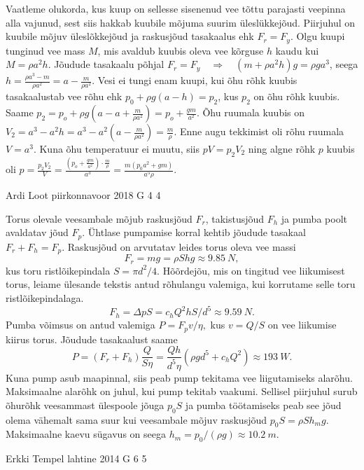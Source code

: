 \documentclass[11pt, twoside]{article}
\begin{document}
{{\ifSolution
Vaatleme olukorda, kus kuup on sellesse sisenenud vee tõttu parajasti veepinna alla vajunud, sest siis hakkab kuubile  mõjuma suurim üleslükkejõud. Piirjuhul on kuubile mõjuv üleslõkkejõud ja raskusjõud tasakaalus ehk $F_r = F_y$. Olgu kuupi tunginud vee mass $M$, mis avaldub kuubis oleva vee kõrguse $h$ kaudu kui $M = \rho a^2h$. Jõudude tasakaalu põhjal $F_r = F_y \quad\Rightarrow\quad (m + \rho a^2h)g=\rho ga^3$, seega $h = \frac{\rho a^3 - m}{\rho a^2} = a - \frac{m}{\rho a^2}$. Vesi ei tungi enam kuupi, kui õhu rõhk kuubis tasakaalustab vee rõhu ehk $p_0 + \rho g(a-h) = p_2$, kus $p_2$ on õhu rõhk kuubis. Saame $p_2 = p_o + \rho g\left(a - a + \frac{m}{\rho a^2}\right) = p_o +  \frac{gm}{a^2}$. Õhu ruumala kuubis on $V_2 = a^3 - a^2h = a^3 - a^2\left(a - \frac{m}{\rho a^2}\right) = \frac{m}{\rho}$. Enne augu tekkimist oli rõhu ruumala $V=a^3$. Kuna õhu temperatuur ei muutu, siis $pV = p_2V_2$ ning algne rõhk $p$ kuubis oli
$p = \frac{p_2V_2}{V} = \frac{ \left( p_o +  \frac{gm}{a^2} \right) \cdot \frac{m}{\rho}}{a^3} = \frac{m(p_0a^2 + gm)}{a^5\rho}$.
\fi
}

{Ardi Loot} %
{piirkonnavoor} %
{2018} %
{G 4} %
{4} %
{

\ifSolution
\osa Torus olevale veesambale mõjub raskusjõud $F_{r}$, takistusjõud $F_{h}$
ja pumba poolt avaldatav jõud $F_{p}$. Ühtlase pumpamise korral
kehtib jõudude tasakaal $F_{r}+F_{h}=F_{p}$. Raskusjõud on
arvutatav leides torus oleva vee massi
\[
F_{r}=mg=\rho Shg\approx\SI{9.85}{N},
\]
kus toru ristlõikepindala $S=\pi d^{2}/4.$ Hõõrdejõu, mis
on tingitud vee liikumisest torus, leiame ülesande tekstis antud rõhulangu
valemiga, kui korrutame selle toru ristlõikepindalaga.
\[
F_{h}=\Delta pS=c_{h}Q^{2}hS/d^{5}\approx\SI{9.59}{N}.
\]
Pumba võimsus on antud valemiga $P=F_{p}v/\eta,$ kus $v=Q/S$
on vee liikumise kiirus torus. Jõudude tasakaalust saame
\[
P=\left(F_{r}+F_{h}\right)\frac{Q}{S\eta}=\frac{Qh}{d^{5}\eta}\left(\rho gd^{5}+c_{h}Q^{2}\right)\approx\SI{193}{W}.
\]
\osa Kuna pump asub maapinnal, siis peab pump tekitama vee liigutamiseks
alarõhu. Maksimaalne alarõhk on juhul, kui pump tekitab vaakumi.
Sellisel piirjuhul surub õhurõhk veesammast ülespoole jõuga $p_{0}S$
ja pumba töötamiseks peab see jõud olema vähemalt sama suur kui veesambale
mõjuv raskusjõud $p_{0}S=\rho Sh_{m}g.$ Maksimaalne kaevu sügavus
on seega $h_{m}=p_{0}/\left(\rho g\right)\approx\SI{10.2}{m}$.
\fi
}

{Erkki Tempel} %
{lahtine} %
{2014} %
{G 6} %
{5} %
{

}}
\end{document}

